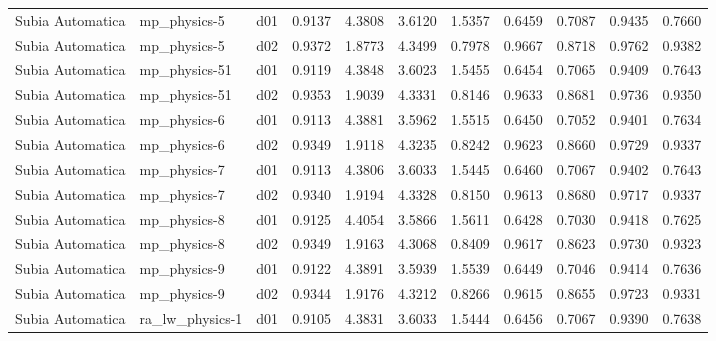 \begin{longtable}{lllrrrrrrrr}
     Subia Automatica  &          mp\_physics-5 &     d01 &   0.9137 &   4.3808 &   3.6120 &       1.5357 &        0.6459 &       0.7087 &           0.9435 &  0.7660 \\
     Subia Automatica  &          mp\_physics-5 &     d02 &   0.9372 &   1.8773 &   4.3499 &       0.7978 &        0.9667 &       0.8718 &           0.9762 &  0.9382 \\
     Subia Automatica  &         mp\_physics-51 &     d01 &   0.9119 &   4.3848 &   3.6023 &       1.5455 &        0.6454 &       0.7065 &           0.9409 &  0.7643 \\
     Subia Automatica  &         mp\_physics-51 &     d02 &   0.9353 &   1.9039 &   4.3331 &       0.8146 &        0.9633 &       0.8681 &           0.9736 &  0.9350 \\
     Subia Automatica  &          mp\_physics-6 &     d01 &   0.9113 &   4.3881 &   3.5962 &       1.5515 &        0.6450 &       0.7052 &           0.9401 &  0.7634 \\
     Subia Automatica  &          mp\_physics-6 &     d02 &   0.9349 &   1.9118 &   4.3235 &       0.8242 &        0.9623 &       0.8660 &           0.9729 &  0.9337 \\
     Subia Automatica  &          mp\_physics-7 &     d01 &   0.9113 &   4.3806 &   3.6033 &       1.5445 &        0.6460 &       0.7067 &           0.9402 &  0.7643 \\
     Subia Automatica  &          mp\_physics-7 &     d02 &   0.9340 &   1.9194 &   4.3328 &       0.8150 &        0.9613 &       0.8680 &           0.9717 &  0.9337 \\
     Subia Automatica  &          mp\_physics-8 &     d01 &   0.9125 &   4.4054 &   3.5866 &       1.5611 &        0.6428 &       0.7030 &           0.9418 &  0.7625 \\
     Subia Automatica  &          mp\_physics-8 &     d02 &   0.9349 &   1.9163 &   4.3068 &       0.8409 &        0.9617 &       0.8623 &           0.9730 &  0.9323 \\
     Subia Automatica  &          mp\_physics-9 &     d01 &   0.9122 &   4.3891 &   3.5939 &       1.5539 &        0.6449 &       0.7046 &           0.9414 &  0.7636 \\
     Subia Automatica  &          mp\_physics-9 &     d02 &   0.9344 &   1.9176 &   4.3212 &       0.8266 &        0.9615 &       0.8655 &           0.9723 &  0.9331 \\
     Subia Automatica  &       ra\_lw\_physics-1 &     d01 &   0.9105 &   4.3831 &   3.6033 &       1.5444 &        0.6456 &       0.7067 &           0.9390 &  0.7638 \\

\end{longtable}
